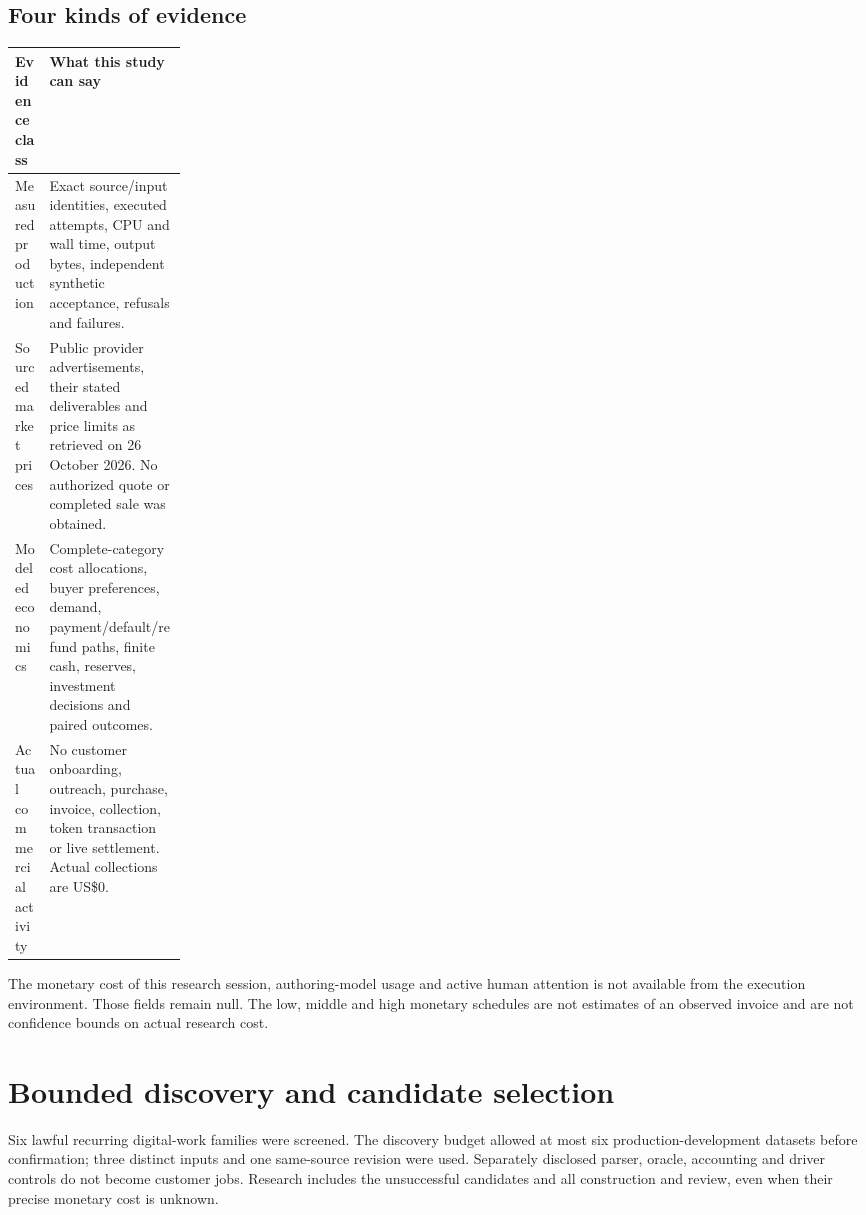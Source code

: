 \documentclass[11pt,letterpaper]{article}
\newcommand{\usd}[1]{US\$#1}
\begin{document}
\subsection{Four kinds of evidence}
\begin{tabularx}{\linewidth}{@{}P{0.2\linewidth}Y@{}}
\toprule
Evidence class & What this study can say \\
\midrule
Measured production & Exact source/input identities, executed attempts, CPU and wall time, output bytes, independent synthetic acceptance, refusals and failures. \\
Sourced market prices & Public provider advertisements, their stated deliverables and price limits as retrieved on 26 October 2026. No authorized quote or completed sale was obtained. \\
Modeled economics & Complete-category cost allocations, buyer preferences, demand, payment/default/refund paths, finite cash, reserves, investment decisions and paired outcomes. \\
Actual commercial activity & No customer onboarding, outreach, purchase, invoice, collection, token transaction or live settlement. Actual collections are \usd{0}. \\
\bottomrule
\end{tabularx}
\par\smallskip
The monetary cost of this research session, authoring-model usage and active human attention is not available from the execution environment. Those fields remain null. The low, middle and high monetary schedules are not estimates of an observed invoice and are not confidence bounds on actual research cost.

\section{Bounded discovery and candidate selection}
Six lawful recurring digital-work families were screened. The discovery budget allowed at most six production-development datasets before confirmation; three distinct inputs and one same-source revision were used. Separately disclosed parser, oracle, accounting and driver controls do not become customer jobs. Research includes the unsuccessful candidates and all construction and review, even when their precise monetary cost is unknown.
\end{document}
